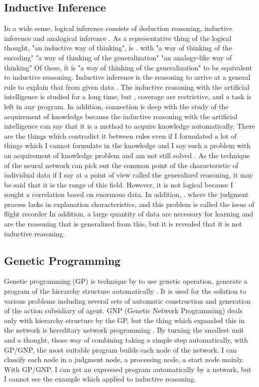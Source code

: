 \documentclass{article}
\begin{document}
\subsection {Inductive Inference}
In a wide sense, logical inference consists of deduction reasoning, inductive inference and analogical inference \cite{math300}.
As a representative thing of the logical thought, "an inductive way of thinking", is \cite{saito:11}. with "a way of thinking of the encoding" "a way of thinking of the generalization" "an analogy-like way of thinking"
Of these, it is "a way of thinking of the generalization" to be equivalent to inductive reasoning.
Inductive inference is the reasoning to arrive at a general rule to explain that from given data \cite {inductive-reasoning}.
The inductive reasoning with the artificial intelligence is studied for a long time, but \cite{CASE1983193}\cite{4767034}, coverage are restrictive, and a task is left in any program.
In addition, connection is deep with the study of the acquirement of knowledge because the inductive reasoning with the artificial intelligence can say that it is a method to acquire knowledge automatically.
There are the things which contradict it between rules even if I formulated a lot of things which I cannot formulate in the knowledge and I say such a problem with an acquirement of knowledge problem and am not still solved \cite{KnowledgeAI}\cite{KAIssues}.
As the technique of the neural network can pick out the common point of the characteristic of individual data if I say at a point of view called the generalized reasoning, it may be said that it is the range of this field.
However, it is not logical because I sought a correlation based on enormous data.
In addition, \cite{BlackBoxProblem}. where the judgment process lacks in explanation characteristics, and this problem is called the issue of flight recorder
In addition, a large quantity of data are necessary for learning and are the reasoning that is generalized from this, but it is revealed that it is not inductive reasoning.
\subsection {Genetic Programming}
Genetic programming (GP) is technique by to use genetic operation, generate a program of the hierarchy structure automatically \cite{Koza1994}.
It is used for the solution to various problems including several sets of automatic construction and generation of the action subsidiary of agent.
GNP (Genetic Network Programming) deals only with hierarchy structure by the GP, but the thing which expanded this in the network is hereditary network programming \cite{gnp}.
By turning the smallest unit and a thought, those way of combining taking a simple step automatically, with GP/GNP, the most suitable program builds each node of the network.
I can classify each node in a judgment node, a processing node, a start node mainly.
With GP/GNP, I can get an expressed program automatically by a network, but I cannot see the example which applied to inductive reasoning.
\end{document}
